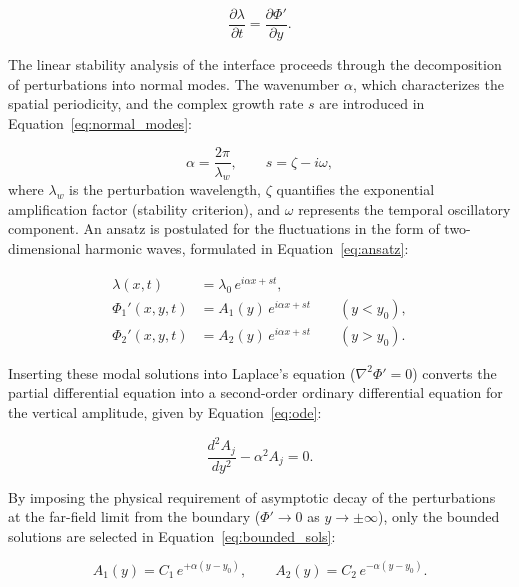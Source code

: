 \begin{equation} \label{eq:kinematic_linear}
    \frac{\partial \lambda}{\partial t} = \frac{\partial \Phi'}{\partial y}.
\end{equation}

The linear stability analysis of the interface proceeds through the decomposition of perturbations into normal modes. The wavenumber $\alpha$, which characterizes the spatial periodicity, and the complex growth rate $s$ are introduced in Equation~\ref{eq:normal_modes}:

\begin{equation} \label{eq:normal_modes}
    \alpha = \frac{2\pi}{\lambda_w}, \qquad s = \zeta - i\omega,
\end{equation}
where $\lambda_w$ is the perturbation wavelength, $\zeta$ quantifies the exponential amplification factor (stability criterion), and $\omega$ represents the temporal oscillatory component. An ansatz is postulated for the fluctuations in the form of two-dimensional harmonic waves, formulated in Equation~\ref{eq:ansatz}:

\begin{equation} \label{eq:ansatz}
\begin{aligned}
\lambda(x,t) &= \lambda_0 \,e^{i\alpha x + st}, \\
\Phi_1'(x,y,t) &= A_1(y) \,e^{i\alpha x + st} \qquad (y < y_0), \\
\Phi_2'(x,y,t) &= A_2(y) \,e^{i\alpha x + st} \qquad (y > y_0).
\end{aligned}
\end{equation}

Inserting these modal solutions into Laplace's equation ($\nabla^2 \Phi' = 0$) converts the partial differential equation into a second-order ordinary differential equation for the vertical amplitude, given by Equation~\ref{eq:ode}:

\begin{equation} \label{eq:ode}
    \frac{d^2 A_j}{dy^2} - \alpha^2 A_j = 0.
\end{equation}

By imposing the physical requirement of asymptotic decay of the perturbations at the far-field limit from the boundary ($\Phi' \to 0$ as $y \to \pm \infty$), only the bounded solutions are selected in Equation~\ref{eq:bounded_sols}:

\begin{equation} \label{eq:bounded_sols}
    A_1(y) = C_1 \,e^{+\alpha(y - y_0)}, \qquad A_2(y) = C_2 \,e^{-\alpha(y - y_0)}.
\end{equation}

